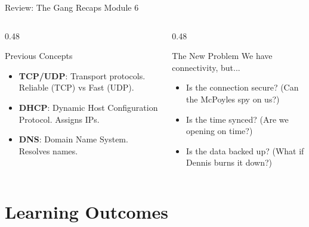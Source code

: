 \documentclass[aspectratio=169]{beamer}  %
\begin{document}
\begin{frame}{Review: The Gang Recaps Module 6}
    \begin{columns}[T]
        \begin{column}{0.48\textwidth}
            \begin{block}{Previous Concepts}
                \small
                \begin{itemize}
                    \item \textbf{TCP/UDP}: Transport protocols. Reliable (TCP) vs Fast (UDP).
                    \item \textbf{DHCP}: Dynamic Host Configuration Protocol. Assigns IPs.
                    \item \textbf{DNS}: Domain Name System. Resolves names.
                \end{itemize}
            \end{block}
        \end{column}
        \begin{column}{0.48\textwidth}
            \begin{alertblock}{The New Problem}
                \small
                We have connectivity, but...
                \begin{itemize}
                    \item Is the connection secure? (Can the McPoyles spy on us?)
                    \item Is the time synced? (Are we opening on time?)
                    \item Is the data backed up? (What if Dennis burns it down?)
                \end{itemize}
            \end{alertblock}
        \end{column}
    \end{columns}
\end{frame}

\section*{Learning Outcomes}
\end{document}
